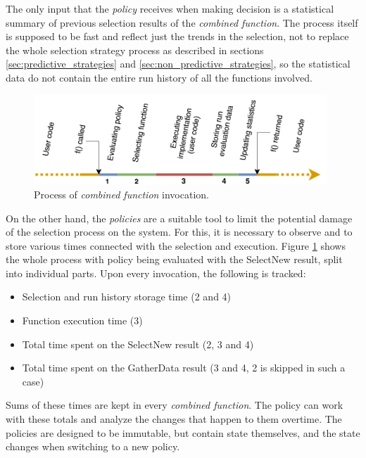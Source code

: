 The only input that the \textit{policy} receives when making decision is a statistical summary of previous selection results of the \textit{combined function}. The process itself is supposed to be fast and reflect just the trends in the selection, not to replace the whole selection strategy process as described in sections \ref{sec:predictive_strategies} and \ref{sec:non_predictive_strategies}, so the statistical data do not contain the entire run history of all the functions involved.

\begin{figure}[h!]
	\captionsetup{justification=centering,margin=0.5cm}
	\centerline{\mbox{\includegraphics[width=110mm]{./img/run_schema.png}}}
	\caption{Process of \textit{combined function} invocation.}
	\label{fig:run_schema}
\end{figure}

On the other hand, the \textit{policies} are a suitable tool to limit the potential damage of the selection process on the system. For this, it is necessary to observe and to store various times connected with the selection and execution. Figure \ref{fig:run_schema} shows the whole process with policy being evaluated with the SelectNew result, split into individual parts. Upon every invocation, the following is tracked:

\begin{itemize}
	\item Selection and run history storage time (2 and 4)
	\item Function execution time (3)
	\item Total time spent on the SelectNew result (2, 3 and 4)
	\item Total time spent on the GatherData result (3 and 4, 2 is skipped in such a case)
\end{itemize}

Sums of these times are kept in every \textit{combined function}. The policy can work with these totals and analyze the changes that happen to them overtime. The policies are designed to be immutable, but contain state themselves, and the state changes when switching to a new policy.

